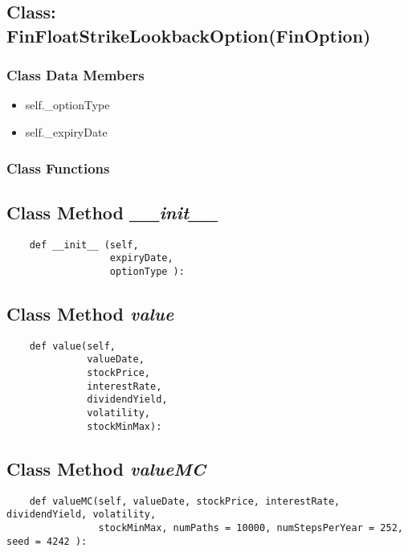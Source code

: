 \documentclass[twoside,11pt]{book}
\begin{document}
\subsection{Class: FinFloatStrikeLookbackOption(FinOption)}


\subsubsection{Class Data Members}
\begin{itemize}
\item{self.\_optionType}
\item{self.\_expiryDate}
\end{itemize}

\subsubsection{Class Functions}

\subsection{Class Method {\it \_\_init\_\_ }}


\begin{lstlisting}
    def __init__ (self,
                  expiryDate,
                  optionType ):
\end{lstlisting}

\subsection{Class Method {\it value}}


\begin{lstlisting}
    def value(self,
              valueDate,
              stockPrice,
              interestRate,
              dividendYield,
              volatility, 
              stockMinMax):
\end{lstlisting}

\subsection{Class Method {\it valueMC}}


\begin{lstlisting}
    def valueMC(self, valueDate, stockPrice, interestRate, dividendYield, volatility, 
                stockMinMax, numPaths = 10000, numStepsPerYear = 252, seed = 4242 ):
\end{lstlisting}
\end{document}

